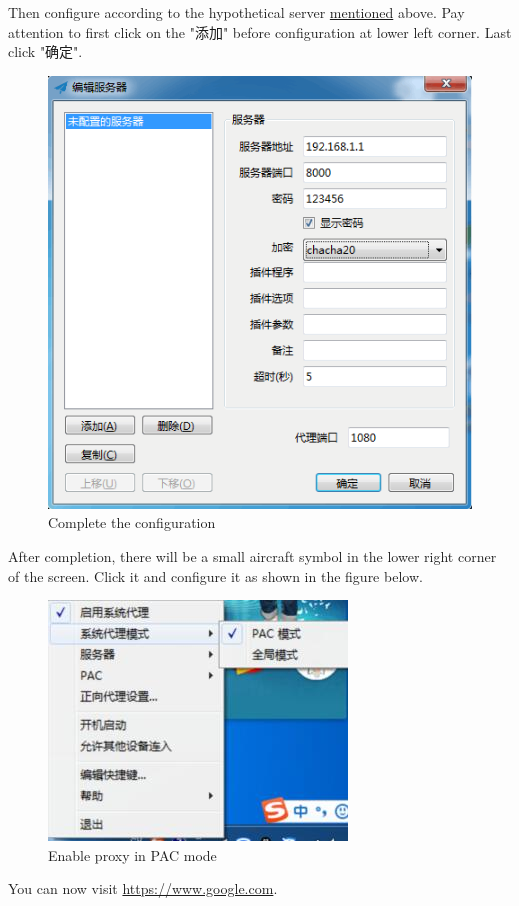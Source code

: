 \documentclass[12pt]{wx672article}
\begin{document}
\begin{itemize}
Then configure according to the hypothetical server \hyperref[org78958ea]{mentioned} above. Pay attention to
first click on the "添加" before configuration at lower left corner. Last click "确定".


\begin{figure}[!htb]
\centering
\includegraphics[width=350xp]{./images/windows3.jpg}
\caption{\label{fig:org0a5ee01}
Complete the configuration}
\end{figure}

After completion, there will be a small aircraft symbol in the lower right corner of the
screen. Click it and configure it as shown in the figure below.
\begin{figure}[!htb]
\centering
\includegraphics[width=350xp]{./images/windows4.jpg}
\caption{\label{fig:org4a74505}
Enable proxy in PAC mode}
\end{figure}

You can now visit \url{https://www.google.com}.
\end{itemize}
\end{document}
